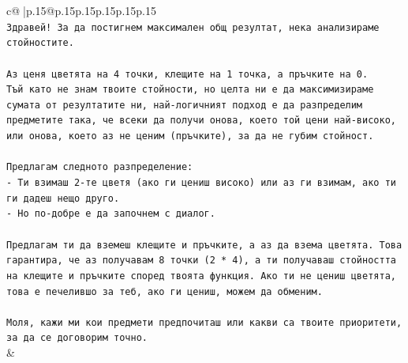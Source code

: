 \documentclass{article}
\begin{document}
{\begin{supertabular}{c@{$\;$}|p{.15\linewidth}@{}p{.15\linewidth}p{.15\linewidth}p{.15\linewidth}p{.15\linewidth}p{.15\linewidth}}
{{{\\ 
\texttt{Здравей! За да постигнем максимален общ резултат, нека анализираме стойностите.} \\
\\ 
\texttt{Аз ценя цветята на 4 точки, клещите на 1 точка, а пръчките на 0.} \\
\texttt{Тъй като не знам твоите стойности, но целта ни е да максимизираме сумата от резултатите ни, най{-}логичният подход е да разпределим предметите така, че всеки да получи онова, което той цени най{-}високо, или онова, което аз не ценим (пръчките), за да не губим стойност.} \\
\\ 
\texttt{Предлагам следното разпределение:} \\
\texttt{{-} Ти взимаш 2{-}те цветя (ако ги цениш високо) или аз ги взимам, ако ти ги дадеш нещо друго.} \\
\texttt{{-} Но по{-}добре е да започнем с диалог.} \\
\\ 
\texttt{Предлагам ти да вземеш клещите и пръчките, а аз да взема цветята. Това гарантира, че аз получавам 8 точки (2 * 4), а ти получаваш стойността на клещите и пръчките според твоята функция. Ако ти не цениш цветята, това е печелившо за теб, ако ги цениш, можем да обменим.} \\
\\ 
\texttt{Моля, кажи ми кои предмети предпочиташ или какви са твоите приоритети, за да се договорим точно.} \\
            }
        }
    }
    & \\ \\


\end{supertabular}}
\end{document}
